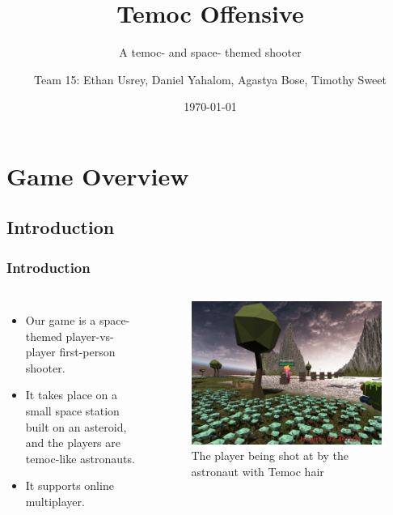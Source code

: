 \documentclass{beamer}
\title{Temoc Offensive}
\subtitle{A temoc- and space- themed shooter}
\author{Team 15: Ethan Usrey, Daniel Yahalom, Agastya Bose, Timothy Sweet}
\institute{The University of Texas at Dallas}
\date{\today}
\begin{document}
\begin{frame}
\titlepage
\end{frame}

\section{Game Overview}
\subsection{Introduction}

\begin{frame}
\frametitle{Introduction}
    \begin{columns}
    \begin{itemize}
        \item Our game is a space-themed player-vs-player first-person shooter.
        \item It takes place on a small space station built on an asteroid, and the players are temoc-like astronauts.
        \item It supports online multiplayer.
    \end{itemize}
        \begin{figure}
            \includegraphics[width=\textwidth]{being_shot_at}
            \caption{The player being shot at by the astronaut with Temoc hair}
        \end{figure}
    \end{columns}
\end{frame}
\end{document}
